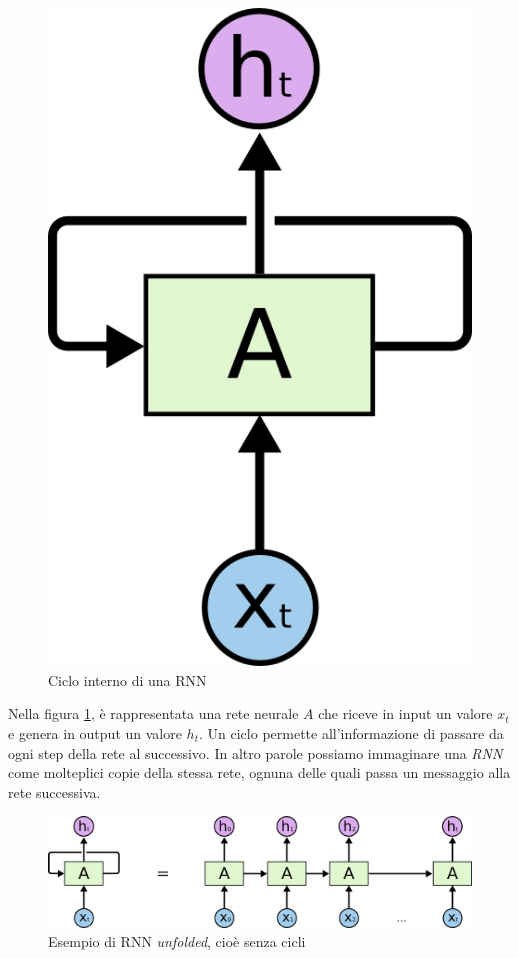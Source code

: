 \documentclass[a4paper,12pt,openright,twoside]{report}
\theoremstyle{definition}
\begin{document}
\begin{figure}[ht]
	\centering
	\includegraphics[scale=0.5]{Immagini/rnn1.png}
	\caption{Ciclo interno di una RNN}
	\label{fig:rnn1}
\end{figure}

Nella figura \ref{fig:rnn1}, è rappresentata una rete neurale $A$ che riceve in input un valore $x_t$ e genera in output un valore $h_t$.
Un ciclo permette all'informazione di passare da ogni step della rete al successivo. 
In altro parole possiamo immaginare
una \emph{RNN} come molteplici copie della stessa rete, ognuna delle quali passa un messaggio alla rete successiva.

\begin{figure}[ht]
	\centering
	\includegraphics[scale=0.3]{Immagini/rnn2.png}
	\caption{Esempio di RNN \emph{unfolded}, cioè senza cicli}
	\label{fig:rnn2}
\end{figure}
\end{document}
